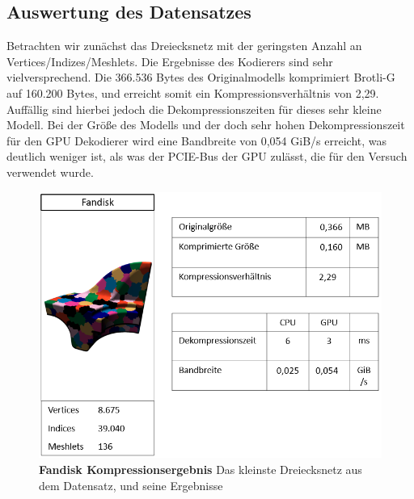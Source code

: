 \subsection{Auswertung des Datensatzes}
\label{subsec:auswertung1}
Betrachten wir zunächst das Dreiecksnetz mit der geringsten Anzahl an Vertices/Indizes/Meshlets. 
Die Ergebnisse des Kodierers sind sehr vielversprechend. 
Die 366.536 Bytes des Originalmodells komprimiert Brotli-G auf 160.200 Bytes, und erreicht somit ein Kompressionsverhältnis von 2,29.
Auffällig sind hierbei jedoch die Dekompressionszeiten für dieses sehr kleine Modell. 
Bei der Größe des Modells und der doch sehr hohen Dekompressionszeit für den GPU Dekodierer wird eine Bandbreite von 0,054 GiB/s erreicht, was deutlich weniger ist, als was der PCIE-Bus der GPU zulässt, die für den Versuch verwendet wurde.

\begin{figure}[htb]
  \centering  
  \includegraphics[scale=0.75]{Bilder/ergebnisse/fandisk.png}
  \caption[Fandisk Kompressionsergebnis]{\textbf{Fandisk Kompressionsergebnis} Das kleinste Dreiecksnetz aus dem Datensatz, und seine Ergebnisse}
  \label{fig:mesh_shading_pipeline}
\end{figure}

